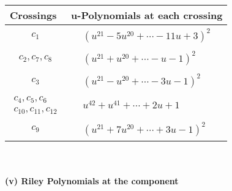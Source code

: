 \documentclass[1p]{elsarticle_modified}
\theoremstyle{definition}
\begin{document}
\begin{tabular}{m{50pt}|m{274pt}}
Crossings & \hspace{64pt}u-Polynomials at each crossing \\
\hline $$\begin{aligned}c_{1}\end{aligned}$$&$\begin{aligned}
&(u^{21}-5 u^{20}+\cdots-11 u+3)^{2}
\end{aligned}$\\
\hline $$\begin{aligned}c_{2},c_{7},c_{8}\end{aligned}$$&$\begin{aligned}
&(u^{21}+u^{20}+\cdots- u-1)^{2}
\end{aligned}$\\
\hline $$\begin{aligned}c_{3}\end{aligned}$$&$\begin{aligned}
&(u^{21}- u^{20}+\cdots-3 u-1)^{2}
\end{aligned}$\\
\hline $$\begin{aligned}c_{4},c_{5},c_{6}\\c_{10},c_{11},c_{12}\end{aligned}$$&$\begin{aligned}
&u^{42}+u^{41}+\cdots+2 u+1
\end{aligned}$\\
\hline $$\begin{aligned}c_{9}\end{aligned}$$&$\begin{aligned}
&(u^{21}+7 u^{20}+\cdots+3 u-1)^{2}
\end{aligned}$\\
\hline
\end{tabular}\\~\\
\newpage\renewcommand{\arraystretch}{1}
\flushleft \textbf{(v) Riley Polynomials at the component}\newline \\
\end{document}
